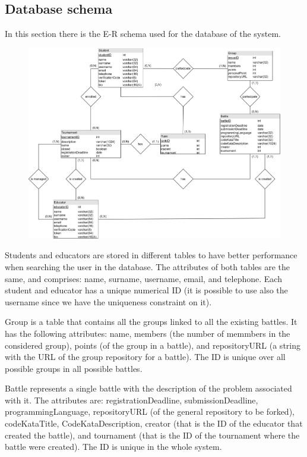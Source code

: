 \documentclass[12pt, a4paper]{report}
\begin{document}
    \newpage
    \subsection{Database schema}
    In this section there is the E-R schema used for the database of the system. 
    \begin{figure}[H]
        \centering
        \includegraphics[width=0.9\linewidth]{images/db.png}
    \end{figure}
    Students and educators are stored in different tables to have better performance when searching the user in the database.
    The attributes of both tables are the same, and comprises: name, surname, username, email, and telephone. 
    Each student and educator has a unique numerical ID (it is possible to use also the username since we have the uniqueness constraint on it). 

    Group is a table that contains all the groups linked to all the existing battles. 
    It has the following attributes: name, members (the number of memmbers in the considered group), points (of the group in a battle), and repositoryURL (a string with the URL of the group repository for a battle).
    The ID is unique over all possible groups in all possible battles.
    
    Battle represents a single battle with the description of the problem associated with it. 
    The attributes are: registrationDeadline, submissionDeadline, programmingLanguage, repositoryURL (of the general repository to be forked), codeKataTitle, CodeKataDescription, creator (that is the ID of the educator that created the battle), and tournament (that is the ID of the tournament where the battle were created). 
    The ID is unique in the whole system. 
\end{document}
